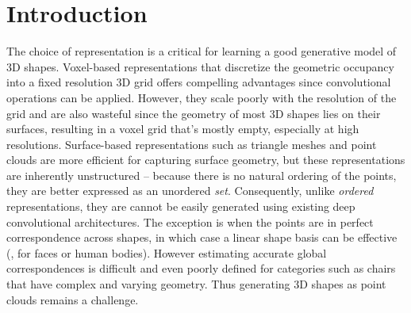 \section{Introduction}\label{sec:intro}
The choice of representation is a critical for learning a good generative model of 3D shapes. Voxel-based representations that discretize the geometric occupancy into a fixed resolution 3D grid offers compelling advantages since convolutional operations can be applied. 
However, they scale poorly with the resolution of the grid and are also wasteful since the geometry of most 3D shapes lies on their surfaces, resulting in a voxel grid that's mostly empty, especially at high resolutions. 
Surface-based representations such as triangle meshes and point clouds are more efficient for capturing surface geometry, but these representations are inherently unstructured -- because there is no natural ordering of the points, they are better expressed as an unordered \emph{set}. Consequently, unlike \emph{ordered} representations, they are cannot be easily generated using existing deep convolutional architectures. 
The exception is when the points are in perfect correspondence across shapes, in which case a linear shape basis can be effective (\eg, for faces or human bodies). However estimating accurate global correspondences is difficult and even poorly defined for categories such as chairs that have complex and varying geometry. Thus generating 3D shapes as point clouds remains a challenge.


